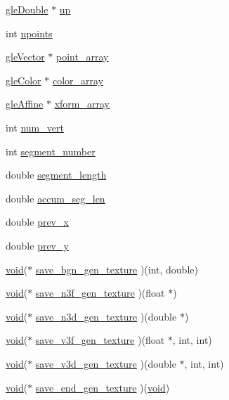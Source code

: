 \begin{DoxyCompactItemize}
\item 
\hyperlink{other__libs_2glut_2_headers_2tube_8h_a7a5ac253b5bacac0f18a7503390e7604}{gle\-Double} $\ast$ \hyperlink{structgle_g_c_a0588c2d0550bff01586b7e3b3e5b7899}{up}
\item 
int \hyperlink{structgle_g_c_a892b2a8340dc3a90b65de9738f78a0e0}{npoints}
\item 
\hyperlink{port_8h_ad396ab4a6fe9749e1e3db38bdf2e6ece}{gle\-Vector} $\ast$ \hyperlink{structgle_g_c_a6d84429068e9ee35f037659ad465a0bc}{point\-\_\-array}
\item 
\hyperlink{tube__gc_8h_a3a3912e470fecfb3ae9229b9b5505643}{gle\-Color} $\ast$ \hyperlink{structgle_g_c_aede9d35db134a66dc25b879039ac9646}{color\-\_\-array}
\item 
\hyperlink{other__libs_2glut_2_headers_2tube_8h_acbf16062767e3844d21ac8211443aa8f}{gle\-Affine} $\ast$ \hyperlink{structgle_g_c_a4328c949813e476ff496186d437f8fc4}{xform\-\_\-array}
\item 
int \hyperlink{structgle_g_c_a4f2ed6f6f5fee00f9a0151c428dade80}{num\-\_\-vert}
\item 
int \hyperlink{structgle_g_c_a39b855ae551de8c4168faba7dc5002df}{segment\-\_\-number}
\item 
double \hyperlink{structgle_g_c_ab77affaea620610a33143998a4ec350a}{segment\-\_\-length}
\item 
double \hyperlink{structgle_g_c_abbc1d404357bb81195b142b599048c39}{accum\-\_\-seg\-\_\-len}
\item 
double \hyperlink{structgle_g_c_a8af294b0236e6642f4c9306736989f07}{prev\-\_\-x}
\item 
double \hyperlink{structgle_g_c_a568f179a91bdac3ae81bb3c6ce7a9fbe}{prev\-\_\-y}
\item 
\hyperlink{glutf90_8h_ac778d6f63f1aaf8ebda0ce6ac821b56e}{void}($\ast$ \hyperlink{structgle_g_c_aea8e942c9fe91ac4707c9a85123f625a}{save\-\_\-bgn\-\_\-gen\-\_\-texture} )(int, double)
\item 
\hyperlink{glutf90_8h_ac778d6f63f1aaf8ebda0ce6ac821b56e}{void}($\ast$ \hyperlink{structgle_g_c_a8f3eeed0ff13ab6fc655904b0760b733}{save\-\_\-n3f\-\_\-gen\-\_\-texture} )(float $\ast$)
\item 
\hyperlink{glutf90_8h_ac778d6f63f1aaf8ebda0ce6ac821b56e}{void}($\ast$ \hyperlink{structgle_g_c_abe902a1ec7d19b571ab7bf120bca5595}{save\-\_\-n3d\-\_\-gen\-\_\-texture} )(double $\ast$)
\item 
\hyperlink{glutf90_8h_ac778d6f63f1aaf8ebda0ce6ac821b56e}{void}($\ast$ \hyperlink{structgle_g_c_a22259b3789a8e6e15819fa65baf8874d}{save\-\_\-v3f\-\_\-gen\-\_\-texture} )(float $\ast$, int, int)
\item 
\hyperlink{glutf90_8h_ac778d6f63f1aaf8ebda0ce6ac821b56e}{void}($\ast$ \hyperlink{structgle_g_c_a89d72bf9a73ae84cfcdfd5e034011595}{save\-\_\-v3d\-\_\-gen\-\_\-texture} )(double $\ast$, int, int)
\item 
\hyperlink{glutf90_8h_ac778d6f63f1aaf8ebda0ce6ac821b56e}{void}($\ast$ \hyperlink{structgle_g_c_abbf86009d37eda20a1a2415caabccfe1}{save\-\_\-end\-\_\-gen\-\_\-texture} )(\hyperlink{glutf90_8h_ac778d6f63f1aaf8ebda0ce6ac821b56e}{void})
\end{DoxyCompactItemize}


